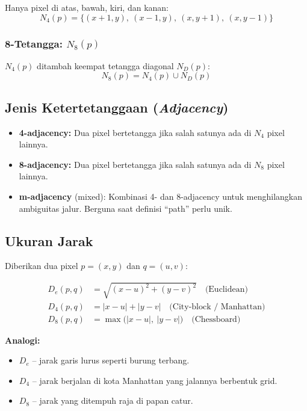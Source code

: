 \documentclass[12pt,a4paper]{article}
\begin{document}
Hanya pixel di atas, bawah, kiri, dan kanan:
\begin{equation}
  N_4(p) = \{(x+1,y),\ (x-1,y),\ (x,y+1),\ (x,y-1)\}
\end{equation}
 
\subsubsection{8-Tetangga: $N_8(p)$}
 
$N_4(p)$ ditambah keempat tetangga diagonal $N_D(p)$:
\begin{equation}
  N_8(p) = N_4(p) \cup N_D(p)
\end{equation}
 
\subsection{Jenis Ketertetanggaan (\textit{Adjacency})}
 
\begin{itemize}
  \item \textbf{4-adjacency:} Dua pixel bertetangga jika salah satunya ada di $N_4$
        pixel lainnya.
  \item \textbf{8-adjacency:} Dua pixel bertetangga jika salah satunya ada di $N_8$
        pixel lainnya.
  \item \textbf{m-adjacency} (mixed): Kombinasi 4- dan 8-adjacency untuk menghilangkan
        ambiguitas jalur. Berguna saat definisi ``path'' perlu unik.
\end{itemize}
 
\subsection{Ukuran Jarak}
 
Diberikan dua pixel $p = (x, y)$ dan $q = (u, v)$:
 
\begin{align}
  D_e(p,q) &= \sqrt{(x-u)^2 + (y-v)^2}
  \quad \text{(Euclidean)} \label{eq:eucl} \\[6pt]
  D_4(p,q) &= |x-u| + |y-v|
  \quad \text{(City-block / Manhattan)} \label{eq:city} \\[6pt]
  D_8(p,q) &= \max\bigl(|x-u|,\ |y-v|\bigr)
  \quad \text{(Chessboard)} \label{eq:chess}
\end{align}
 
\begin{notebox}
  \textbf{Analogi:}
  \begin{itemize}[nosep]
    \item $D_e$ -- jarak garis lurus seperti burung terbang.
    \item $D_4$ -- jarak berjalan di kota Manhattan yang jalannya berbentuk grid.
    \item $D_8$ -- jarak yang ditempuh raja di papan catur.
  \end{itemize}
\end{notebox}
 
\end{document}

